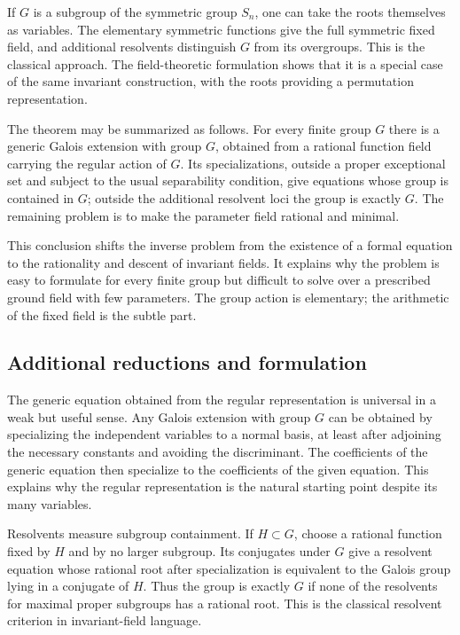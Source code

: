 \documentclass[12pt]{article}
\begin{document}
If \(G\) is a subgroup of the symmetric group \(S_n\), one can take the roots themselves as
variables. The elementary symmetric functions give the full symmetric fixed field, and additional
resolvents distinguish \(G\) from its overgroups. This is the classical approach. The
field-theoretic formulation shows that it is a special case of the same invariant construction, with
the roots providing a permutation representation.


The theorem may be summarized as follows. For every finite group \(G\) there is a generic Galois
extension with group \(G\), obtained from a rational function field carrying the regular action of
\(G\). Its specializations, outside a proper exceptional set and subject to the usual separability
condition, give equations whose group is contained in \(G\); outside the additional resolvent loci
the group is exactly \(G\). The remaining problem is to make the parameter field rational and
minimal.


This conclusion shifts the inverse problem from the existence of a formal equation to the
rationality and descent of invariant fields. It explains why the problem is easy to formulate for
every finite group but difficult to solve over a prescribed ground field with few parameters. The
group action is elementary; the arithmetic of the fixed field is the subtle part.


\subsection{Additional reductions and formulation}

The generic equation obtained from the regular representation is universal in a weak but useful
sense. Any Galois extension with group \(G\) can be obtained by specializing the independent
variables to a normal basis, at least after adjoining the necessary constants and avoiding the
discriminant. The coefficients of the generic equation then specialize to the coefficients of the
given equation. This explains why the regular representation is the natural starting point despite
its many variables.

Resolvents measure subgroup containment. If \(H\subset G\), choose a rational function fixed by
\(H\) and by no larger subgroup. Its conjugates under \(G\) give a resolvent equation whose rational
root after specialization is equivalent to the Galois group lying in a conjugate of \(H\). Thus the
group is exactly \(G\) if none of the resolvents for maximal proper subgroups has a rational root.
This is the classical resolvent criterion in invariant-field language.
\end{document}
